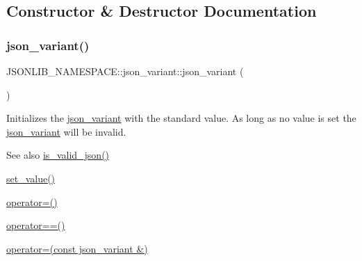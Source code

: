 \subsection{Constructor \& Destructor Documentation}
\mbox{\label{classJSONLIB__NAMESPACE_1_1json__variant_a846c20ca7916959fcf8768f6c5bac36d}} 
\subsubsection{\texorpdfstring{json\+\_\+variant()}{json\_variant()}\hspace{0.1cm}{\footnotesize\ttfamily [1/2]}}
{\footnotesize\ttfamily J\+S\+O\+N\+L\+I\+B\+\_\+\+N\+A\+M\+E\+S\+P\+A\+C\+E\+::json\+\_\+variant\+::json\+\_\+variant (\begin{DoxyParamCaption}{ }\end{DoxyParamCaption})}



Initializes the \hyperlink{classJSONLIB__NAMESPACE_1_1json__variant}{json\+\_\+variant} with the standard value. As long as no value is set the \hyperlink{classJSONLIB__NAMESPACE_1_1json__variant}{json\+\_\+variant} will be invalid. 

\begin{DoxySeeAlso}{See also}
\hyperlink{classJSONLIB__NAMESPACE_1_1json__variant_a158e3148d9256af3d1b8251b2ca7b6c4}{is\+\_\+valid\+\_\+json()} 

\hyperlink{classJSONLIB__NAMESPACE_1_1json__variant_a0cfce194bda4d31ad37d765a6428974a}{set\+\_\+value()} 

\hyperlink{classJSONLIB__NAMESPACE_1_1json__variant_acab384801617885ba1dc3b965a456e7e}{operator=()} 

\hyperlink{classJSONLIB__NAMESPACE_1_1json__variant_aef1fc1a342cc170da06e0d3eb1299aad}{operator==()} 

\hyperlink{classJSONLIB__NAMESPACE_1_1json__variant_acab384801617885ba1dc3b965a456e7e}{operator=(const json\+\_\+variant \&)} 
\end{DoxySeeAlso}
\mbox{\label{classJSONLIB__NAMESPACE_1_1json__variant_a846c20ca7916959fcf8768f6c5bac36d}} 
